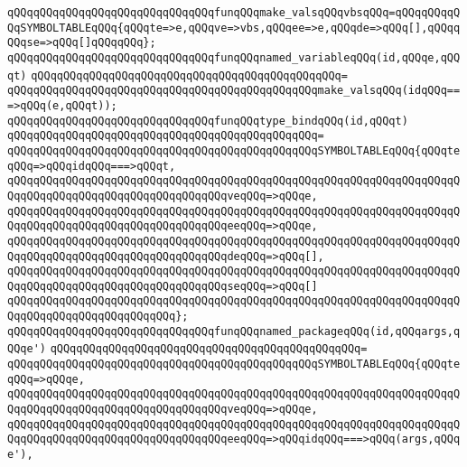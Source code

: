 \verb|qQQqqQQqqQQqqQQqqQQqqQQqqQQqqQQqfunqQQqmake_valsqQQqvbsqQQq=qQQqqQQqqQQqSYMBOLTABLEqQQq{qQQqte=>e,qQQqve=>vbs,qQQqee=>e,qQQqde=>qQQq[],qQQqqQQqse=>qQQq[]qQQqqQQq};|\newline
\newline
\verb|qQQqqQQqqQQqqQQqqQQqqQQqqQQqqQQqfunqQQqnamed_variableqQQq(id,qQQqe,qQQqt)|\newline
\verb|qQQqqQQqqQQqqQQqqQQqqQQqqQQqqQQqqQQqqQQqqQQqqQQq=|\newline
\verb|qQQqqQQqqQQqqQQqqQQqqQQqqQQqqQQqqQQqqQQqqQQqqQQqmake_valsqQQq(idqQQq===>qQQq(e,qQQqt));|\newline
\newline
\verb|qQQqqQQqqQQqqQQqqQQqqQQqqQQqqQQqfunqQQqtype_bindqQQq(id,qQQqt)|\newline
\verb|qQQqqQQqqQQqqQQqqQQqqQQqqQQqqQQqqQQqqQQqqQQqqQQq=|\newline
\verb|qQQqqQQqqQQqqQQqqQQqqQQqqQQqqQQqqQQqqQQqqQQqqQQqSYMBOLTABLEqQQq{qQQqteqQQq=>qQQqidqQQq===>qQQqt,|\newline
\verb|qQQqqQQqqQQqqQQqqQQqqQQqqQQqqQQqqQQqqQQqqQQqqQQqqQQqqQQqqQQqqQQqqQQqqQQqqQQqqQQqqQQqqQQqqQQqqQQqqQQqqQQqveqQQq=>qQQqe,|\newline
\verb|qQQqqQQqqQQqqQQqqQQqqQQqqQQqqQQqqQQqqQQqqQQqqQQqqQQqqQQqqQQqqQQqqQQqqQQqqQQqqQQqqQQqqQQqqQQqqQQqqQQqqQQqeeqQQq=>qQQqe,|\newline
\verb|qQQqqQQqqQQqqQQqqQQqqQQqqQQqqQQqqQQqqQQqqQQqqQQqqQQqqQQqqQQqqQQqqQQqqQQqqQQqqQQqqQQqqQQqqQQqqQQqqQQqqQQqdeqQQq=>qQQq[],|\newline
\verb|qQQqqQQqqQQqqQQqqQQqqQQqqQQqqQQqqQQqqQQqqQQqqQQqqQQqqQQqqQQqqQQqqQQqqQQqqQQqqQQqqQQqqQQqqQQqqQQqqQQqqQQqseqQQq=>qQQq[]|\newline
\verb|qQQqqQQqqQQqqQQqqQQqqQQqqQQqqQQqqQQqqQQqqQQqqQQqqQQqqQQqqQQqqQQqqQQqqQQqqQQqqQQqqQQqqQQqqQQqqQQq};|\newline
\newline
\verb|qQQqqQQqqQQqqQQqqQQqqQQqqQQqqQQqfunqQQqnamed_packageqQQq(id,qQQqargs,qQQqe')|\newline
\verb|qQQqqQQqqQQqqQQqqQQqqQQqqQQqqQQqqQQqqQQqqQQqqQQq=|\newline
\verb|qQQqqQQqqQQqqQQqqQQqqQQqqQQqqQQqqQQqqQQqqQQqqQQqSYMBOLTABLEqQQq{qQQqteqQQq=>qQQqe,|\newline
\verb|qQQqqQQqqQQqqQQqqQQqqQQqqQQqqQQqqQQqqQQqqQQqqQQqqQQqqQQqqQQqqQQqqQQqqQQqqQQqqQQqqQQqqQQqqQQqqQQqqQQqqQQqveqQQq=>qQQqe,|\newline
\verb|qQQqqQQqqQQqqQQqqQQqqQQqqQQqqQQqqQQqqQQqqQQqqQQqqQQqqQQqqQQqqQQqqQQqqQQqqQQqqQQqqQQqqQQqqQQqqQQqqQQqqQQqeeqQQq=>qQQqidqQQq===>qQQq(args,qQQqe'),|\newline
